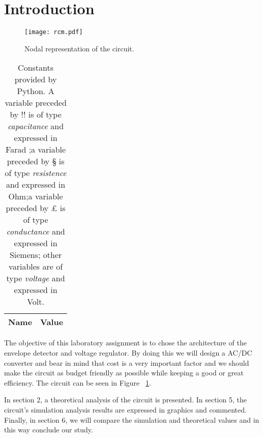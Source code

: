 \section{Introduction}
\label{sec:introduction}

\begin{figure}[htb] \centering
\texttt{[image: rcm.pdf]}
\caption{Nodal representation of the circuit.}
\label{fig:rc}
\end{figure}

\begin{table}[H]
  \centering
  \begin{tabular}{|l|r|}
    \hline    
    {\bf Name} & {\bf Value} \\ \hline
    
  \end{tabular}
  \caption{Constants provided by Python. A variable  preceded by !! is of type {\it capacitance}
    and expressed in Farad ;a variable preceded by § is of type {\it resistence} and expressed in
    Ohm;a variable preceded by £ is of type {\it conductance} and expressed in
    Siemens; other variables are of type {\it voltage} and expressed in
    Volt.}
  \label{tab:op}
\end{table}

The objective of this laboratory assignment is to chose the architecture of the envelope detector and voltage regulator. By doing this we will design a AC/DC converter and bear in mind that cost is a very important factor and we should make the circuit as budget friendly as possible while keeping a good or great efficiency. The circuit can be seen in Figure ~\ref{fig:rc}. 



In section 2, a theoretical analysis of the circuit is presented. In section 5, the circuit's simulation analysis results are expressed in graphics and commented. Finally, in section 6, we will compare the simulation and theoretical values and in this way conclude our study.


